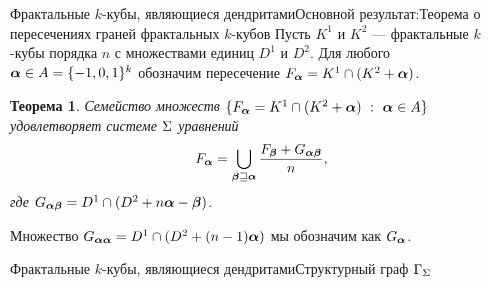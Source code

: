 \documentclass[aspectratio=1610, 10pt, notheorems]{beamer}
\newtheorem{theorem}     {Теорема}
\newtheorem{lemma}       {Лемма}
\newtheorem{definition}  {Определение}
\begin{document}
\begin{frame}{Фрактальные $k$-кубы, являющиеся дендритами}{Основной результат:Теорема о пересечениях граней фрактальных $k$-кубов }
Пусть $K^1$ и $K^2$ --- фрактальные $k$-кубы порядка $n$ с множествами единиц $D^1$ и $D^2$.
Для любого ${\bm{\alpha}}\in A=\{-1,0,1\}^k$ обозначим пересечение $F_{\bm{\alpha}}=K^1\cap(K^2+{\bm{\alpha}})$.

\begin{theorem}\label{IFC}
Семейство множеств $\{F_{\bm{\alpha}}=K^1\cap(K^2+{\bm{\alpha}})\ :\ {\bm{\alpha}}\in A\}$ удовлетворяет системе $\Sigma$ уравнений 
$$F_{\bm{\alpha}}=\bigcup\limits_{{\bm{\beta}}\sqsupseteq{\bm{\alpha}}} 
\dfrac{F_{\bm{\beta}}+G_{{\bm{\alpha}}{\bm{\beta}}}}{n},$$
где $G_{{\bm{\alpha}}{\bm{\beta}}}=D^1\cap(D^2+n{\bm{\alpha}}-{\bm{\beta}})$.
\end{theorem}
Множество $G_{{\bm{\alpha}}{\bm{\alpha}}}=D^1\cap(D^2+(n-1){\bm{\alpha}})$ мы обозначим как $G_{{\bm{\alpha}}}$.
\end{frame}


\begin{frame}{Фрактальные $k$-кубы, являющиеся дендритами}{Структурный граф $\Gamma_\Sigma$}
\end{frame}
\end{document}
